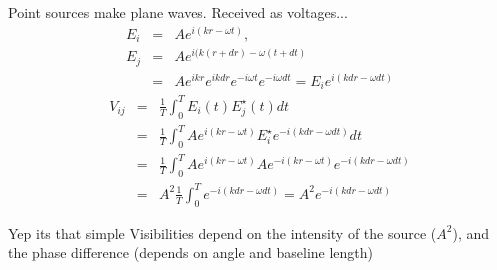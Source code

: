 \documentclass[ignorenonframetext]{beamer}
\begin{document}
\begin{frame}
Point sources make plane waves. Received as voltages...
 \begin{eqnarray*}
E_i & = & A e^{i (k r - \omega t)}, \\
E_j & = & A e^{i (k (r + dr) - \omega (t+dt)} \\
    & = & A e^{ikr} e^{ik d r} e^{-i \omega t}e^{-i \omega d t} = E_i e^{i (k dr - \omega dt)}
 \end{eqnarray*}
 \begin{eqnarray*}
  V_{ij} & = & \frac{1}{T} \int_0^T E_i(t) E_j^{\star}(t) dt \\
   & = & \frac{1}{T} \int_0^T A e^{i (k r - \omega t)} E_i^{\star} e^{-i (k dr - \omega dt)} dt \\
   & = & \frac{1}{T} \int_0^T A e^{i (k r - \omega t)} A e^{-i (k r - \omega t)}  e^{-i (k dr - \omega dt)} \\
   & = & A^2 \frac{1}{T} \int_0^T e^{-i (k dr - \omega dt)} = A^2 e^{-i (k dr - \omega dt)}
 \end{eqnarray*}
 \begin{block}{Yep its that simple}
  Visibilities depend on the intensity of the source ($A^2$), and the phase difference (depends on angle and baseline length)
 \end{block}
\end{frame}
\end{document}
